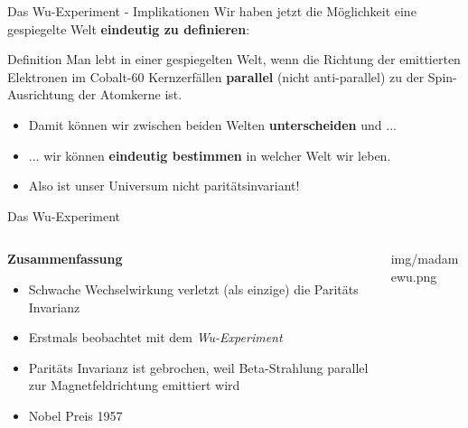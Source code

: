 \begin{frame}{Das Wu-Experiment - Implikationen}
        Wir haben jetzt die M\"oglichkeit eine gespiegelte Welt \textbf{eindeutig zu definieren}:
        \begin{block}{Definition}
            Man lebt in einer gespiegelten Welt, wenn die Richtung der emittierten Elektronen im Cobalt-60 Kernzerf\"allen \textbf{parallel} (nicht anti-parallel) zu der Spin-Ausrichtung der Atomkerne ist.
        \end{block}
    \begin{itemize}
        \item Damit k\"onnen wir zwischen beiden Welten \textbf{unterscheiden} und ...
        \item ... wir k\"onnen \textbf{eindeutig bestimmen} in welcher Welt wir leben.
        \item Also ist unser Universum \textcolor{vertexDarkRed}{nicht parit\"atsinvariant}!
    \end{itemize}
\end{frame}

\begin{frame}{Das Wu-Experiment}
	\begin{columns}[T]
		\begin{column}{.6\textwidth}
            \textbf{Zusammenfassung}
            \begin{itemize}
                \item Schwache Wechselwirkung verletzt (als einzige) die Parit\"ats Invarianz
                \item Erstmals beobachtet mit dem \textit{Wu-Experiment}
                \item Parit\"ats Invarianz ist gebrochen, weil Beta-Strahlung parallel zur Magnetfeldrichtung emittiert wird
                \item Nobel Preis 1957
            \end{itemize}
		\end{column}
		\begin{column}{.4\textwidth}
			\centering
			\begin{overpic}[height=.8\textheight]{img/madamewu.png}
            \end{overpic}\\
            \centering
		\end{column}
	\end{columns}
\end{frame}
